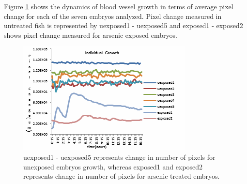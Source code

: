Figure \ref{toxicityAllAs} shows the dynamics of blood vessel growth in terms of average pixel change for each of the seven embryos analyzed. Pixel change measured in untreated fish is represented by uexposed1 - uexposed5 and exposed1 - exposed2 shows pixel change measured for arsenic exposed embryos.
\begin{figure}[!p]
  \begin{center}
    \includegraphics[scale=1]{figure/AllAs.png}
  \end{center}
  \caption[Individual comparison between healthy and treated]{uexposed1 - uexposed5 represents change in number of pixels for unexposed embryos growth, whereas exposed1 and exposed2 represents change in number of pixels for arsenic treated embryos.}
  \label{toxicityAllAs}
\end{figure}

